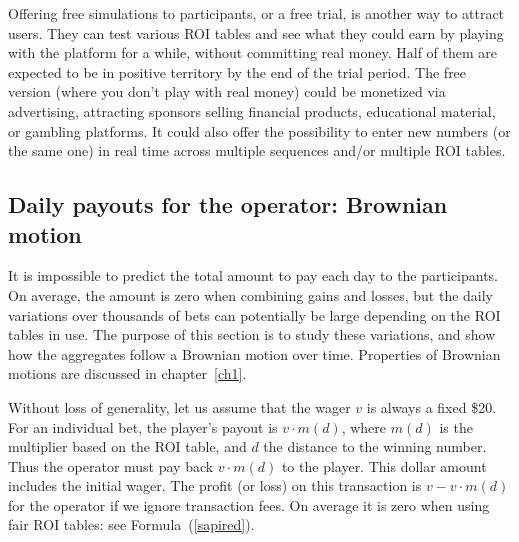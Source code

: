 \documentclass[oneside,10pt]{book}
\begin{document}
Offering free simulations to participants, or a free trial, is another way to attract users. They can test various ROI tables and see what they could earn by playing with the platform for a while, without committing real money. Half of them are expected to be in positive territory by the end of the trial period. The free version (where you don't play with real money) could be monetized via advertising, attracting sponsors selling financial products, educational material, or gambling platforms. It could also offer the possibility to enter new numbers (or the same one) in real time across multiple sequences and/or multiple ROI tables.


\subsection{Daily payouts for the operator: Brownian motion}\label{pozwed}

It is impossible to predict the total amount to pay each day to the participants. On average, the amount 
 is zero when combining gains and losses, but the daily variations over thousands of bets can potentially be large depending on the ROI tables in use. The purpose of this section is to study these variations, and show how the aggregates follow
 a \textcolor{index}{Brownian motion} over time. 
 Properties of Brownian motions are discussed in chapter~\ref{ch1}. 

Without loss of generality, let us assume that the wager $v$ is always a fixed \$20. For an individual bet, 
 the player's payout is $v\cdot m(d)$, where $m(d)$ is the multiplier based on the ROI table, and $d$ the distance to the winning number. Thus the operator must pay back
     $v\cdot m(d)$ to the player. This dollar amount includes the initial wager. The profit (or loss) on this transaction is 
$v-v\cdot m(d)$ for the operator if we ignore transaction fees. On average it is zero when using fair ROI tables: see  Formula~(\ref{sapired}).
\end{document}
